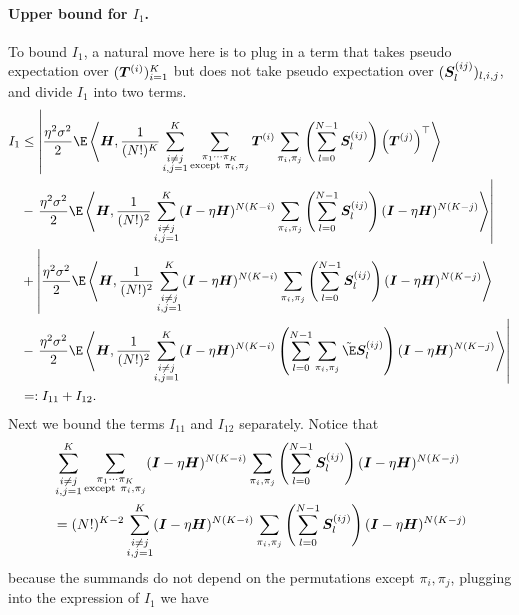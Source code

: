 \paragraph{Upper bound for $I_1$.}
To bound $I_1$, a natural move here is to plug in a term that takes pseudo expectation over $({\bm{T}}^{(i)})_{i=1}^K$ but does not take pseudo expectation over $({\bm{S}}_l^{(ij)})_{l,i,j}$, and divide $I_1$ into two terms.
\begin{align*}
    I_1&\leq \left|\frac{\eta^2\sigma^2}{2}\E\inp{\mH}{\frac{1}{(N!)^K}\sum_{\substack{i\neq j \\i,j=1}}^K\sum_{\substack{\pi_1\cdots \pi_K \\ \text{except} ~\pi_i, \pi_j}}\mT^{(i)}\sum_{\pi_i, \pi_j}\left(\sum_{l=0}^{N-1}\mS_l^{(ij)}\right)\left(\mT^{(j)}\right)^{\top}}\right. \\
    &-\left.\frac{\eta^2\sigma^2}{2}\E\inp{\mH}{\frac{1}{(N!)^2}\sum_{\substack{i\neq j \\i,j=1}}^K(\mI-\eta\mH)^{N(K-i)}\sum_{\pi_i, \pi_j}\left(\sum_{l=0}^{N-1}\mS_l^{(ij)}\right)(\mI-\eta\mH)^{N(K-j)}}\right| \\
    &+ \left|\frac{\eta^2\sigma^2}{2}\E\inp{\mH}{\frac{1}{(N!)^2}\sum_{\substack{i\neq j \\i,j=1}}^K(\mI-\eta\mH)^{N(K-i)}\sum_{\pi_i, \pi_j}\left(\sum_{l=0}^{N-1}\mS_l^{(ij)}\right)(\mI-\eta\mH)^{N(K-j)}}\right. \\
    &-\left.\frac{\eta^2\sigma^2}{2}\E\inp{\mH}{\frac{1}{(N!)^2}\sum_{\substack{i\neq j \\i,j=1}}^K(\mI-\eta\mH)^{N(K-i)}\left(\sum_{l=0}^{N-1}\sum_{\pi_i, \pi_j}\fakeE \mS_l^{(ij)}\right)(\mI-\eta\mH)^{N(K-j)}}\right| \\
    &=:I_{11}+I_{12}.
\end{align*}
Next we bound the terms $I_{11}$ and $I_{12}$ separately. Notice that 
\begin{align}
    &\sum_{\substack{i\neq j \\i,j=1}}^K\sum_{\substack{\pi_1\cdots \pi_K \\ \text{except} ~\pi_i, \pi_j}}({\bm{I}}-\eta{\bm{H}})^{N(K-i)}\sum_{\pi_i, \pi_j}\left(\sum_{l=0}^{N-1}{\bm{S}}_l^{(ij)}\right)({\bm{I}}-\eta{\bm{H}})^{N(K-j)} \notag\\
    &=(N!)^{K-2}\sum_{\substack{i\neq j \\i,j=1}}^K({\bm{I}}-\eta{\bm{H}})^{N(K-i)}\sum_{\pi_i, \pi_j}\left(\sum_{l=0}^{N-1}{\bm{S}}_l^{(ij)}\right)({\bm{I}}-\eta{\bm{H}})^{N(K-j)} \label{equ:open-permu}
\end{align}
because the summands do not depend on the permutations except $\pi_i, \pi_j$,  plugging  into the expression of $I_1$ we have
